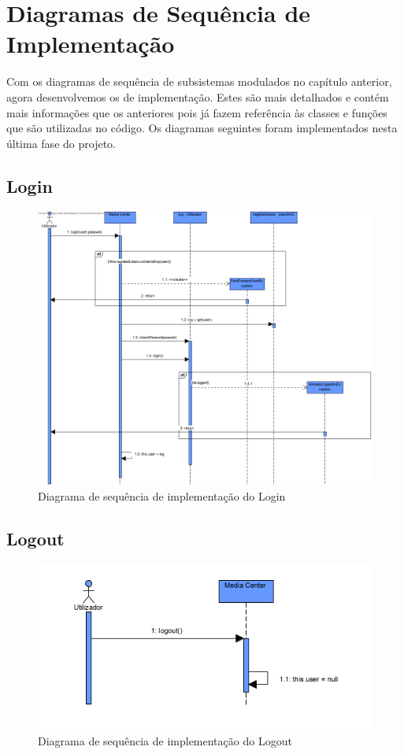\documentclass[a4paper]{report}
\begin{document}
\chapter{Diagramas de Sequência de Implementação}

Com os diagramas de sequência de subsistemas modulados no capítulo anterior,
agora desenvolvemos os de implementação. Estes são mais detalhados e contém
mais informações que os anteriores pois já fazem referência às classes e
funções que são utilizadas no código. Os diagramas seguintes foram implementados
nesta última fase do projeto.

\section{Login}

\begin{figure}[H]
	\centering 
    \includegraphics[width=\textwidth]{images/loginImp.png}  
    \caption{Diagrama de sequência de implementação do Login}
\end{figure}

\section{Logout}

\begin{figure}[H]
	\centering 
    \includegraphics[width=\textwidth]{images/logoutImp.png}  
    \caption{Diagrama de sequência de implementação do Logout}
\end{figure}
\end{document}
